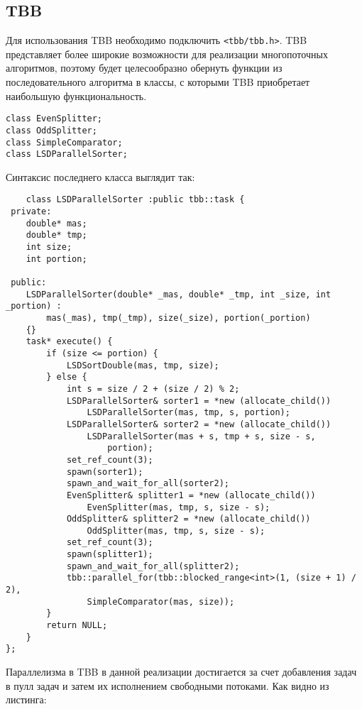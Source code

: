 \documentclass{article}
\begin{document}
\subsection{TBB}
Для использования TBB необходимо подключить \verb|<tbb/tbb.h>|.
TBB представляет более широкие возможности для реализации многопоточных алгоритмов, поэтому будет целесообразно обернуть функции из последовательного алгоритма в классы, с которыми TBB приобретает наибольшую функциональность.
\vspace{10pt}
\begin{lstlisting}
class EvenSplitter;
class OddSplitter;
class SimpleComparator;
class LSDParallelSorter;
\end{lstlisting}
\vspace{-25pt}
\par Синтаксис последнего класса выглядит так:
\vspace{10pt}
\begin{lstlisting}
    class LSDParallelSorter :public tbb::task {
 private:
    double* mas;
    double* tmp;
    int size;
    int portion;

 public:
    LSDParallelSorter(double* _mas, double* _tmp, int _size, int _portion) :
        mas(_mas), tmp(_tmp), size(_size), portion(_portion)
    {}
    task* execute() {
        if (size <= portion) {
            LSDSortDouble(mas, tmp, size);
        } else {
            int s = size / 2 + (size / 2) % 2;
            LSDParallelSorter& sorter1 = *new (allocate_child())
                LSDParallelSorter(mas, tmp, s, portion);
            LSDParallelSorter& sorter2 = *new (allocate_child())
                LSDParallelSorter(mas + s, tmp + s, size - s,
                    portion);
            set_ref_count(3);
            spawn(sorter1);
            spawn_and_wait_for_all(sorter2);
            EvenSplitter& splitter1 = *new (allocate_child())
                EvenSplitter(mas, tmp, s, size - s);
            OddSplitter& splitter2 = *new (allocate_child())
                OddSplitter(mas, tmp, s, size - s);
            set_ref_count(3);
            spawn(splitter1);
            spawn_and_wait_for_all(splitter2);
            tbb::parallel_for(tbb::blocked_range<int>(1, (size + 1) / 2),
                SimpleComparator(mas, size));
        }
        return NULL;
    }
};
\end{lstlisting}
\vspace{-25pt}
Параллелизма в TBB в данной реализации достигается за счет добавления задач в пулл задач и затем их исполнением свободными потоками. Как видно из листинга:
\end{document}
